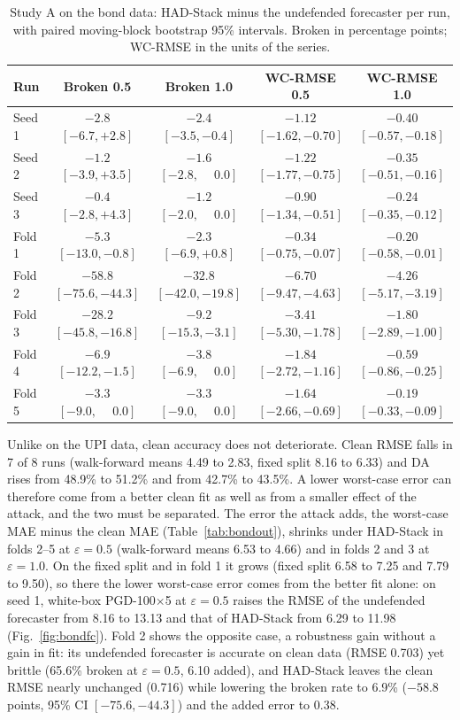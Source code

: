 \documentclass[conference]{IEEEtran}
\begin{document}
\begin{table}[t]
\centering
\caption{Study A on the bond data: HAD-Stack minus the undefended forecaster per run, with paired moving-block bootstrap 95\% intervals. Broken in percentage points; WC-RMSE in the units of the series.}
\label{tab:bondci}
\footnotesize
\setlength{\tabcolsep}{6pt}
\begin{tabular}{lcccc}
\toprule
Run & Broken 0.5 & Broken 1.0 & WC-RMSE 0.5 & WC-RMSE 1.0\\
\midrule
Seed 1 & $-2.8$ $[-6.7,+2.8]$ & $-2.4$ $[-3.5,-0.4]$ & $-1.12$ $[-1.62,-0.70]$ & $-0.40$ $[-0.57,-0.18]$\\
Seed 2 & $-1.2$ $[-3.9,+3.5]$ & $-1.6$ $[-2.8,\phantom{+}0.0]$ & $-1.22$ $[-1.77,-0.75]$ & $-0.35$ $[-0.51,-0.16]$\\
Seed 3 & $-0.4$ $[-2.8,+4.3]$ & $-1.2$ $[-2.0,\phantom{+}0.0]$ & $-0.90$ $[-1.34,-0.51]$ & $-0.24$ $[-0.35,-0.12]$\\
Fold 1 & $-5.3$ $[-13.0,-0.8]$ & $-2.3$ $[-6.9,+0.8]$ & $-0.34$ $[-0.75,-0.07]$ & $-0.20$ $[-0.58,-0.01]$\\
Fold 2 & $-58.8$ $[-75.6,-44.3]$ & $-32.8$ $[-42.0,-19.8]$ & $-6.70$ $[-9.47,-4.63]$ & $-4.26$ $[-5.17,-3.19]$\\
Fold 3 & $-28.2$ $[-45.8,-16.8]$ & $-9.2$ $[-15.3,-3.1]$ & $-3.41$ $[-5.30,-1.78]$ & $-1.80$ $[-2.89,-1.00]$\\
Fold 4 & $-6.9$ $[-12.2,-1.5]$ & $-3.8$ $[-6.9,\phantom{+}0.0]$ & $-1.84$ $[-2.72,-1.16]$ & $-0.59$ $[-0.86,-0.25]$\\
Fold 5 & $-3.3$ $[-9.0,\phantom{+}0.0]$ & $-3.3$ $[-9.0,\phantom{+}0.0]$ & $-1.64$ $[-2.66,-0.69]$ & $-0.19$ $[-0.33,-0.09]$\\
\bottomrule
\end{tabular}
\end{table}

Unlike on the UPI data, clean accuracy does not deteriorate. Clean RMSE falls in 7 of 8 runs (walk-forward means 4.49 to 2.83, fixed split 8.16 to 6.33) and DA rises from 48.9\% to 51.2\% and from 42.7\% to 43.5\%. A lower worst-case error can therefore come from a better clean fit as well as from a smaller effect of the attack, and the two must be separated. The error the attack adds, the worst-case MAE minus the clean MAE (Table~\ref{tab:bondout}), shrinks under HAD-Stack in folds 2--5 at $\varepsilon{=}0.5$ (walk-forward means 6.53 to 4.66) and in folds 2 and 3 at $\varepsilon{=}1.0$. On the fixed split and in fold 1 it grows (fixed split 6.58 to 7.25 and 7.79 to 9.50), so there the lower worst-case error comes from the better fit alone: on seed 1, white-box PGD-100$\times$5 at $\varepsilon{=}0.5$ raises the RMSE of the undefended forecaster from 8.16 to 13.13 and that of HAD-Stack from 6.29 to 11.98 (Fig.~\ref{fig:bondfc}). Fold 2 shows the opposite case, a robustness gain without a gain in fit: its undefended forecaster is accurate on clean data (RMSE 0.703) yet brittle (65.6\% broken at $\varepsilon{=}0.5$, 6.10 added), and HAD-Stack leaves the clean RMSE nearly unchanged (0.716) while lowering the broken rate to 6.9\% ($-58.8$ points, 95\% CI $[-75.6,-44.3]$) and the added error to 0.38.
\end{document}
